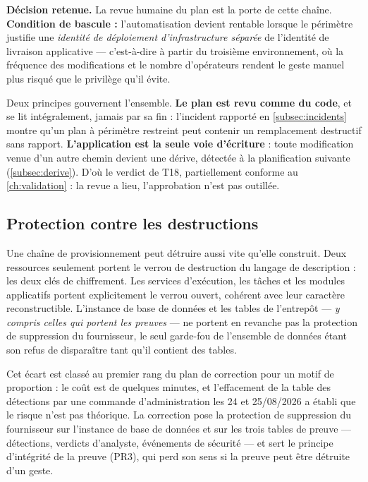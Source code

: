 \begin{keybox}[boxsep=1pt, left=4pt, right=4pt, top=3pt, bottom=3pt]
\textbf{Décision retenue.} La revue humaine du plan est la porte de cette chaîne.
\textbf{Condition de bascule :} l'automatisation devient rentable lorsque le périmètre justifie
une \emph{identité de déploiement d'infrastructure séparée} de l'identité de livraison
applicative --- c'est-à-dire à partir du troisième environnement, où la fréquence des
modifications et le nombre d'opérateurs rendent le geste manuel plus risqué que le privilège
qu'il évite.
\end{keybox}

Deux principes gouvernent l'ensemble. \textbf{Le plan est revu comme du code}, et se lit
intégralement, jamais par sa fin : l'incident rapporté en \cref{subsec:incidents} montre qu'un plan
à périmètre restreint peut contenir un remplacement destructif sans rapport.
\textbf{L'application est la seule voie d'écriture} : toute modification venue d'un autre chemin
devient une dérive, détectée à la planification suivante (\cref{subsec:derive}). D'où le verdict de
T18, partiellement conforme au \cref{ch:validation} : la revue a lieu, l'approbation n'est pas outillée.

\subsection{Protection contre les destructions}

Une chaîne de provisionnement peut détruire aussi vite qu'elle construit. Deux ressources seulement
portent le verrou de destruction du langage de description : les deux clés de chiffrement. Les
services d'exécution, les tâches et les modules applicatifs portent explicitement le verrou ouvert,
cohérent avec leur caractère reconstructible. L'instance de base de données et les tables de
l'entrepôt --- \emph{y compris celles qui portent les preuves} --- ne portent en revanche pas la
protection de suppression du fournisseur, le seul garde-fou de l'ensemble de données étant son refus
de disparaître tant qu'il contient des tables.

\begin{alertbox}[boxsep=1pt, left=4pt, right=4pt, top=3pt, bottom=3pt]
Cet écart est classé au premier rang du plan de correction pour un motif de proportion : le coût est
de quelques minutes, et l'effacement de la table des détections par une commande d'administration
les 24 et 25/08/2026 a établi que le risque n'est pas théorique. La correction pose la protection de
suppression du fournisseur sur l'instance de base de données et sur les trois tables de preuve ---
détections, verdicts d'analyste, événements de sécurité --- et sert le principe d'intégrité de la
preuve (PR3), qui perd son sens si la preuve peut être détruite d'un geste.
\end{alertbox}

